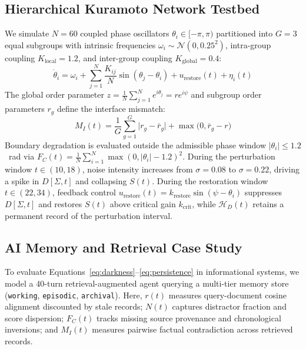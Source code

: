 \documentclass[11pt,twocolumn]{article}
\begin{document}
\subsection{Hierarchical Kuramoto Network Testbed}
We simulate $N = 60$ coupled phase oscillators $\theta_i \in [-\pi, \pi)$ partitioned into $G = 3$ equal subgroups with intrinsic frequencies $\omega_i \sim \mathcal{N}(0, 0.25^2)$, intra-group coupling $K_{\text{local}} = 1.2$, and inter-group coupling $K_{\text{global}} = 0.4$:
\begin{equation}
\dot{\theta}_i = \omega_i + \sum_{j=1}^{N} \frac{K_{ij}}{N} \sin(\theta_j - \theta_i) + u_{\text{restore}}(t) + \eta_i(t)
\end{equation}
The global order parameter $z = \frac{1}{N}\sum_{j=1}^N e^{i\theta_j} = r e^{i\psi}$ and subgroup order parameters $r_g$ define the interface mismatch:
\begin{equation}
M_I(t) = \frac{1}{G}\sum_{g=1}^{G} \bigl|r_g - \bar{r}_g\bigr| + \max\bigl(0, \bar{r}_g - r\bigr)
\end{equation}
Boundary degradation is evaluated outside the admissible phase window $|\theta_i| \le 1.2$~rad via $F_C(t) = \frac{1}{N}\sum_{i=1}^N \max(0, |\theta_i| - 1.2)^2$. During the perturbation window $t \in (10, 18)$, noise intensity increases from $\sigma = 0.08$ to $\sigma = 0.22$, driving a spike in $D[\Sigma, t]$ and collapsing $S(t)$. During the restoration window $t \in (22, 34)$, feedback control $u_{\text{restore}}(t) = k_{\text{restore}} \sin(\psi - \theta_i)$ suppresses $D[\Sigma, t]$ and restores $S(t)$ above critical gain $k_{\text{crit}}$, while $\mathcal{H}_D(t)$ retains a permanent record of the perturbation interval.

\subsection{AI Memory and Retrieval Case Study}
To evaluate Equations~\eqref{eq:darkness}--\eqref{eq:persistence} in informational systems, we model a 40-turn retrieval-augmented agent querying a multi-tier memory store (\texttt{working}, \texttt{episodic}, \texttt{archival}). Here, $r(t)$ measures query-document cosine alignment discounted by stale records; $N(t)$ captures distractor fraction and score dispersion; $F_C(t)$ tracks missing source provenance and chronological inversions; and $M_I(t)$ measures pairwise factual contradiction across retrieved records.
\end{document}
